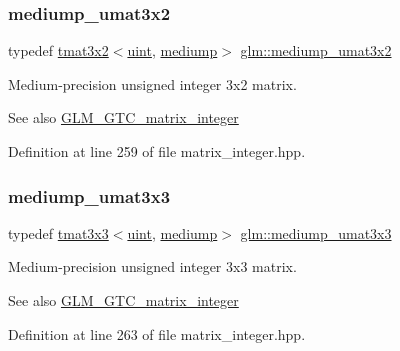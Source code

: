 \subsubsection{\texorpdfstring{mediump\_umat3x2}{mediump\_umat3x2}}
{\footnotesize\ttfamily typedef \mbox{\hyperlink{structglm_1_1tmat3x2}{tmat3x2}}$<$\mbox{\hyperlink{group__core__precision_ga4fd29415871152bfb5abd588334147c8}{uint}}, \mbox{\hyperlink{namespaceglm_a0f04f086094c747d227af4425893f545a6416f3ea0c9025fb21ed50c4d6620482}{mediump}}$>$ \mbox{\hyperlink{group__gtc__matrix__integer_ga62243caa5b85b1cf91021ce6ffc21183}{glm\+::mediump\+\_\+umat3x2}}}

Medium-\/precision unsigned integer 3x2 matrix. \begin{DoxySeeAlso}{See also}
\mbox{\hyperlink{group__gtc__matrix__integer}{G\+L\+M\+\_\+\+G\+T\+C\+\_\+matrix\+\_\+integer}} 
\end{DoxySeeAlso}


Definition at line 259 of file matrix\+\_\+integer.\+hpp.

\mbox{\label{group__gtc__matrix__integer_gaa55f7815a399a780907a1dcd4caef7d9}} 
\subsubsection{\texorpdfstring{mediump\_umat3x3}{mediump\_umat3x3}}
{\footnotesize\ttfamily typedef \mbox{\hyperlink{structglm_1_1tmat3x3}{tmat3x3}}$<$\mbox{\hyperlink{group__core__precision_ga4fd29415871152bfb5abd588334147c8}{uint}}, \mbox{\hyperlink{namespaceglm_a0f04f086094c747d227af4425893f545a6416f3ea0c9025fb21ed50c4d6620482}{mediump}}$>$ \mbox{\hyperlink{group__gtc__matrix__integer_gaa55f7815a399a780907a1dcd4caef7d9}{glm\+::mediump\+\_\+umat3x3}}}

Medium-\/precision unsigned integer 3x3 matrix. \begin{DoxySeeAlso}{See also}
\mbox{\hyperlink{group__gtc__matrix__integer}{G\+L\+M\+\_\+\+G\+T\+C\+\_\+matrix\+\_\+integer}} 
\end{DoxySeeAlso}


Definition at line 263 of file matrix\+\_\+integer.\+hpp.

\mbox{\label{group__gtc__matrix__integer_ga21a2361cc10822ad1a2297ac286c8e26}} 
